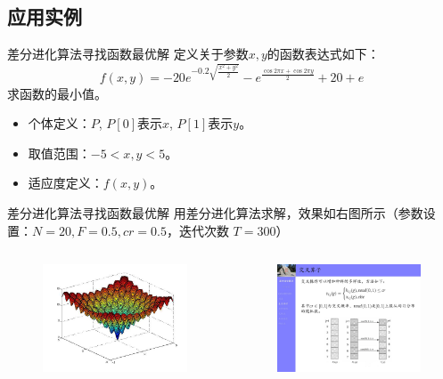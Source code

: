 \subsection{应用实例}
\begin{frame}{差分进化算法寻找函数最优解}
	定义关于参数$x, y$的函数表达式如下：
	$$f(x,y)=-20e^{-0.2\sqrt{\frac{x^2+y^2}{2}}}-e^{\frac{\cos2\pi x+\cos2\pi y}{2}}+20+e$$
	求函数的最小值。
	\begin{itemize}
		\item 个体定义：$P$, $P[0]$表示$x$, $P[1]$表示$y$。
		\item 取值范围：$-5 < x, y < 5$。
		\item 适应度定义：$f(x,y)$。
	\end{itemize}
\end{frame}

\begin{frame}{差分进化算法寻找函数最优解}
	用差分进化算法求解，效果如右图所示（参数设置：$N=20, F=0.5, cr=0.5$，迭代次数 $T=300$）
	\begin{columns}
		\begin{column}{0.45\textwidth}
			\begin{figure}
				\vspace{-0.8cm}
				\includegraphics [width =2.0in]{../images/function.png}
			\end{figure}
		\end{column}
		\begin{column}{0.55\textwidth}
			\begin{figure}
				\includegraphics [width =2.0in]{../images/curve.png}
			\end{figure}
		\end{column}
	\end{columns}
\end{frame}

